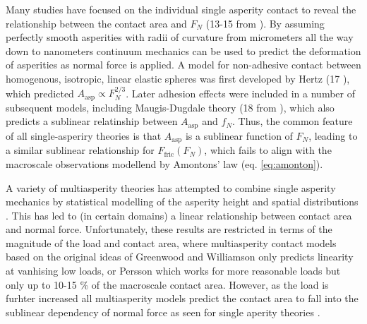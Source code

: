 Many studies have focused on the individual single asperity contact to
reveal the relationship between the contact area and $F_N$ (13-15 from
\cite{mo_friction_2009}). By assuming perfectly smooth asperities with radii of
curvature from micrometers all the way down to nanometers continuum mechanics can be used to predict the deformation of asperities as normal force is applied. A model for non-adhesive contact between homogenous, isotropic, linear elastic spheres was
first developed by Hertz (17 \cite{mo_friction_2009}), which predicted
$A_{\text{asp}} \propto F_N^{2/3}$. Later adhesion effects were included in a
number of subsequent models, including Maugis-Dugdale theory (18 from
\cite{mo_friction_2009}), which also predicts a sublinear relatinship between
$A_{\text{asp}}$ and $f_N$. Thus, the common feature of all single-asperiry theories is that $A_{\text{asp}}$ is a sublinear function of $F_N$, leading to a similar sublinear relationship for $F_\text{fric}(F_N)$, which fails to align with the macroscale observations modellend by Amontons’ law (eq. \eqref{eq:amonton}).

A variety of multiasperity theories has attempted to combine single asperity mechanics by statistical modelling of the asperity height and spatial distributions \cite{CARBONE20082555}. This has led to (in certain domains) a linear relationship between contact area and normal force. Unfortunately, these results are restricted in terms of the magnitude of the load and contact area, where multiasperity contact models based on the original ideas of Greenwood and Williamson \cite{GW} only predicts linearity at vanhising low loads, or Persson \cite{Persson} which works for more reasonable loads but only up to 10-15 \% of the macroscale contact area. However, as the load is furhter increased all multiasperity models predict the contact area to fall into the sublinear dependency of normal force as seen for single aperity theories \cite{CARBONE20082555}.







